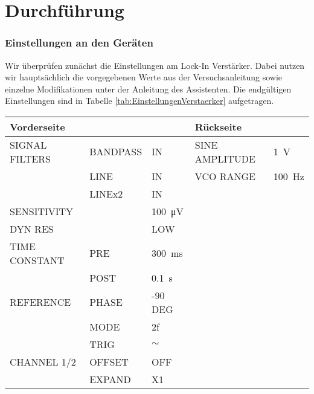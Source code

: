 \section{Durchführung}

\subsubsection*{Einstellungen an den Geräten}

Wir überprüfen zunächst die Einstellungen am Lock-In Verstärker.
Dabei nutzen wir hauptsächlich die vorgegebenen Werte aus der Versuchsanleitung \cite{Anleitung} sowie einzelne Modifikationen unter der Anleitung des Assistenten.
Die endgültigen Einstellungen sind in Tabelle \ref{tab:EinstellungenVerstaerker} aufgetragen.

\minipage{\linewidth}
    \begin{center}
        \captionsetup{type=table}
        \begin{adjustbox}{max width=\linewidth, keepaspectratio}
            \begin{tabular}{lllll}
            \toprule
            Vorderseite    & ~        & ~                       & Rückseite      & ~                \\
            \midrule
            SIGNAL FILTERS & BANDPASS & IN                      & SINE AMPLITUDE & \SI{1}{\volt}    \\
            ~              & LINE     & IN                      & VCO RANGE      & \SI{100}{\hertz} \\
            ~              & LINEx2   & IN                      & ~              & ~                \\
            SENSITIVITY    & ~        & \SI{100}{\micro\volt}   & ~              & ~                \\
            DYN RES        & ~        & LOW                     & ~              & ~                \\
            TIME CONSTANT  & PRE      & \SI{300}{\milli\second} & ~              & ~                \\
                           & POST     & \SI{0.1}{\second}       & ~              & ~                \\
            REFERENCE      & PHASE    & -90 DEG                 & ~              & ~                \\
            ~              & MODE     & 2f                      & ~              & ~                \\
            ~              & TRIG     & $\sim$                  & ~              & ~                \\
            CHANNEL 1/2    & OFFSET   & OFF                     & ~              & ~                \\
            ~              & EXPAND   & X1                      & ~              & ~                \\
            \bottomrule
            \end{tabular}
        \end{adjustbox}
        \label{tab:EinstellungenVerstaerker}
    \end{center}
